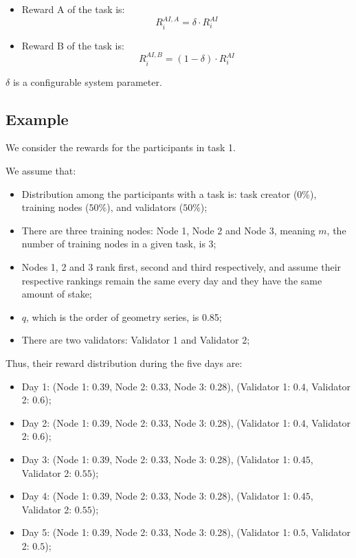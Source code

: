 \documentclass[conference]{IEEEtran}
\begin{document}
\begin{itemize}
            \begin{itemize}
            \item Reward A of the \SNT task is: 
            $$R^{AI, A}_i = \delta \cdot R^{AI}_i$$ 
            

        \item Reward B of the \SNT task is:
        $$R^{AI, B}_i = (1-\delta) \cdot R^{AI}_i$$

        \end{itemize}
        $\delta$ is a configurable system parameter.



\end{itemize}

\subsection{Example} 

We consider the rewards for the participants in task 1.

We assume that:
\begin{itemize}
    \item Distribution among the participants with a task is: task creator ($0\%$), training nodes ($50\%$), and validators ($50\%$);
    \item There are three training nodes: Node 1, Node 2 and Node 3, meaning $m$, the number of training nodes in a given task, is 3;
    \item Nodes 1, 2 and 3 rank first, second and third respectively, and assume their respective rankings remain the same every day and they have the same amount of stake;
    \item $q$, which is the order of geometry series, is 0.85;
    \item There are two validators: Validator 1 and Validator 2;
    \end{itemize}
 Thus, their reward distribution during the five days are:
    \begin{itemize}
        \item Day 1: (Node 1: $0.39$, Node 2: $0.33$, Node 3: 0.28), (Validator 1: $0.4$, Validator 2: $0.6$);
        \item Day 2: (Node 1: $0.39$, Node 2: $0.33$, Node 3: 0.28), (Validator 1: $0.4$, Validator 2: $0.6$);
        \item Day 3: (Node 1: $0.39$, Node 2: $0.33$, Node 3: 0.28), (Validator 1: $0.45$, Validator 2: $0.55$);
        \item Day 4: (Node 1: $0.39$, Node 2: $0.33$, Node 3: 0.28), (Validator 1: $0.45$, Validator 2: $0.55$);
        \item Day 5: (Node 1: $0.39$, Node 2: $0.33$, Node 3: 0.28), (Validator 1: $0.5$, Validator 2: $0.5$);
    \end{itemize}
\end{document}
